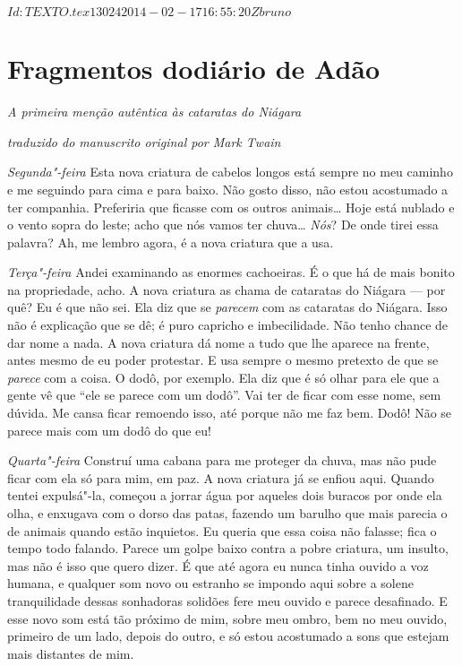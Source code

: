 \SVN $Id: TEXTO.tex 13024 2014-02-17 16:55:20Z bruno $

\chapter[Fragmentos do diário de Adão]{Fragmentos do\break diário de Adão}



\textit{A primeira menção autêntica às cataratas do Niágara}


\begin{flushright}
\itshape{traduzido do manuscrito original por Mark Twain}
\end{flushright}



\textit{Segunda"-feira}  
Esta nova criatura de cabelos longos está sempre no meu caminho e
me seguindo para cima e para baixo. Não gosto disso, não estou acostumado
a ter companhia. Preferiria que ficasse com os outros animais\ldots{}
Hoje está nublado e o vento sopra do leste; acho que nós vamos ter chuva\ldots{}
\textit{Nós}? De onde tirei essa palavra? Ah, me lembro agora, é a nova criatura que a usa.

\textit{Terça"-feira}  Andei examinando as enormes cachoeiras. É o que há de mais bonito
na propriedade, acho. A nova criatura as chama de cataratas do Niágara --- por
quê? Eu é que não sei. Ela diz que se \textit{parecem} com as cataratas do Niágara.
Isso não é explicação que se dê; é puro capricho e imbecilidade. Não tenho 
chance de dar nome a nada. A nova criatura dá nome a tudo que lhe aparece na
frente, antes mesmo de eu poder protestar. E usa sempre o mesmo pretexto de que se
\textit{parece} com a coisa. O dodô, por exemplo. Ela diz que é só olhar para ele
que a gente vê que “ele se parece com um dodô”. Vai ter de ficar com esse
nome, sem dúvida. Me cansa ficar remoendo isso, até porque não me faz bem.
Dodô! Não se parece mais com um dodô do que eu!

\textit{Quarta"-feira}    Construí uma cabana para me proteger da chuva, mas não pude ficar
com ela só para mim, em paz. A nova criatura já se enfiou aqui. Quando tentei
expulsá"-la, começou a jorrar água por aqueles dois buracos por onde ela
olha, e enxugava com o dorso das patas, fazendo um barulho que mais parecia o de
animais quando estão inquietos. Eu queria que essa coisa não falasse; fica o
tempo todo falando. Parece um golpe baixo contra a pobre criatura, um
insulto, mas não é isso que quero dizer. É que até agora eu nunca tinha ouvido
a voz humana, e qualquer som novo ou estranho se impondo aqui sobre a solene
tranquilidade dessas sonhadoras solidões fere meu ouvido e parece desafinado. E
esse novo som está tão próximo de mim, sobre meu ombro, bem no meu ouvido,
primeiro de um lado, depois do outro, e só estou acostumado a sons que estejam
mais distantes de mim.

